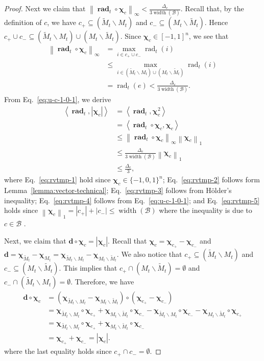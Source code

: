 \documentclass{article}
\newcommand{\B}{\mathcal B}
\newcommand{\del}{\backslash}
\DeclareMathOperator{\rank}{width}
\DeclareMathOperator{\rad}{rad}
\newcommand{\inn}[1]{\left\langle #1 \right\rangle}
\newcommand{\nor}[1]{\left\|#1\right\|}
\renewcommand{\vec}[1]{\boldsymbol{#1}}
\renewcommand{\odot}{\circ}
\begin{document}
\begin{proof}
Next we claim that $\nor{\vec \rad_t \odot \vec \chi_c}_\infty < \frac{\Delta_e}{3\rank(\B)}$.
Recall that, by the definition of $c$, we have
$c_+\subseteq (\tilde M_t \del M_t)$ and $c_-\subseteq (M_t\del \tilde M_t)$. 
Hence $c_+\cup c_- \subseteq  (\tilde M_t \del M_t)\cup (M_t\del \tilde M_t)$.
Since $\vec \chi_c \in [-1,1]^n$, we see that 
\begin{align}
\nor{\vec \rad_t \odot \vec \chi_c}_\infty &= \max_{i\in  c_+\cup c_-} \rad_t(i) \nonumber \\
									    &\le \max_{i\in  (\tilde M_t \del M_t)\cup (M_t\del \tilde M_t)} \rad_t(i)  \nonumber \\
									    &= \rad_t(e) < \frac{\Delta_e}{3\rank(\B)} \label{eq:u-c-1-0-1}.
\end{align}
From Eq.~\eqref{eq:u-c-1-0-1}, we derive
\begin{align}
\inn{\vec \rad_t, |\vec \chi_c|} &= \inn{\vec\rad_t, \vec\chi_c^2} \label{eq:rvtmp-1}\\
																 &= \inn{\vec\rad_t \odot\vec\chi_c, \vec\chi_c} \label{eq:rvtmp-2}\\
																 &\le \nor{\vec\rad_t\odot \vec\chi_c}_\infty \nor{\vec\chi_c}_1 \label{eq:rvtmp-3}\\
																 &\le \frac{\Delta_e}{3\rank(\B)}\nor{\vec\chi_c}_1 \label{eq:rvtmp-4}\\
																 &\le \frac{\Delta_e}{3}\label{eq:rvtmp-5},
\end{align}
where Eq.~\eqref{eq:rvtmp-1} hold since $\vec\chi_c \in \{-1,0,1\}^n$; 
Eq.~\eqref{eq:rvtmp-2} follows form Lemma~\ref{lemma:vector-technical};
Eq.~\eqref{eq:rvtmp-3} follows from H\"older's inequality;
Eq.~\eqref{eq:rvtmp-4} follows from Eq.~\eqref{eq:u-c-1-0-1};
and Eq.~\eqref{eq:rvtmp-5} holds since $\nor{\vec\chi_c}_1=|c_+|+|c_-| \le \rank(\B)$ where the inequality is due to $c\in \B$ .

Next, we claim that $\vec d \odot \vec \chi_c = |\vec \chi_c|$.
Recall that $\vec\chi_c = \vec\chi_{c_+}-\vec\chi_{c_-}$
and $\vec d = \vec \chi_{\tilde M_t}-\vec \chi_{M_t} = \vec\chi_{\tilde M_t\del M_t} - \vec\chi_{M_t\del \tilde M_t}$.
We also notice that $c_+ \subseteq (\tilde M_t \del M_t)$ and $c_- \subseteq (M_t \del \tilde M_t)$.
This implies that $c_+ \cap (M_t \del \tilde M_t) = \emptyset$ and $c_-\cap (\tilde M_t \del M_t) = \emptyset$.
Therefore, we have
\begin{align*}
\vec d \odot \vec \chi_c &= (\vec\chi_{\tilde M_t\del M_t} - \vec\chi_{M_t\del \tilde M_t})\odot(\vec\chi_{c_+}-\vec\chi_{c_-})\\
&= \vec\chi_{\tilde M_t\del M_t}\odot \vec\chi_{c_+}+
   \vec\chi_{M_t \del \tilde M_t}\odot \vec\chi_{c_-}-
   \vec\chi_{\tilde M_t\del M_t}\odot \vec\chi_{c_-}-
   \vec\chi_{M_t\del \tilde M_t}\odot \vec\chi_{c_+}\\
&= \vec\chi_{\tilde M_t\del M_t}\odot \vec\chi_{c_+}+
   \vec\chi_{M_t \del \tilde M_t}\odot \vec\chi_{c_-} \\
&= \vec\chi_{c_+}+\vec\chi_{c_-} =|\vec\chi_c|. 
\end{align*}
where the last equality holds since $c_+\cap c_- =\emptyset$.


\end{proof}
\end{document}
